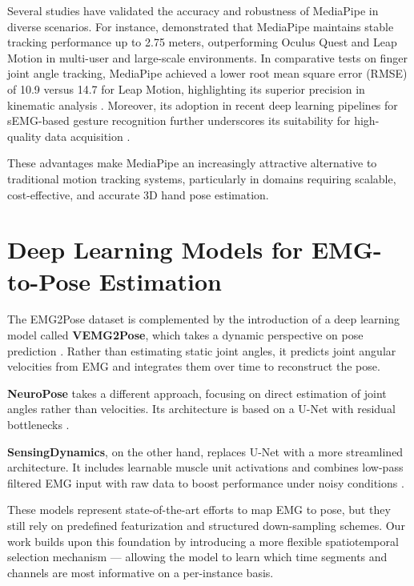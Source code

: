 Several studies have validated the accuracy and robustness of MediaPipe in diverse scenarios. For instance, \cite{reimer2023evaluation} demonstrated that MediaPipe maintains stable tracking performance up to 2.75 meters, outperforming Oculus Quest and Leap Motion in multi-user and large-scale environments. In comparative tests on finger joint angle tracking, MediaPipe achieved a lower root mean square error (RMSE) of 10.9\textdegree{} versus 14.7\textdegree{} for Leap Motion, highlighting its superior precision in kinematic analysis \cite{maggioni2025optimisation}. Moreover, its adoption in recent deep learning pipelines for sEMG-based gesture recognition further underscores its suitability for high-quality data acquisition \cite{lee2022explainable}.

These advantages make MediaPipe an increasingly attractive alternative to traditional motion tracking systems, particularly in domains requiring scalable, cost-effective, and accurate 3D hand pose estimation.

\section{Deep Learning Models for EMG-to-Pose Estimation}

The EMG2Pose dataset is complemented by the introduction of a deep learning model called \textbf{VEMG2Pose}, which takes a dynamic perspective on pose prediction \cite{salter2024emg2pose}. Rather than estimating static joint angles, it predicts joint angular velocities from EMG and integrates them over time to reconstruct the pose.

\textbf{NeuroPose} takes a different approach, focusing on direct estimation of joint angles rather than velocities. Its architecture is based on a U-Net with residual bottlenecks \cite{lee2022explainable}.

\textbf{SensingDynamics}, on the other hand, replaces U-Net with a more streamlined architecture. It includes learnable muscle unit activations and combines low-pass filtered EMG input with raw data to boost performance under noisy conditions \cite{zanghieri2023semg}.

These models represent state-of-the-art efforts to map EMG to pose, but they still rely on predefined featurization and structured down-sampling schemes. Our work builds upon this foundation by introducing a more flexible spatiotemporal selection mechanism — allowing the model to learn which time segments and channels are most informative on a per-instance basis.

